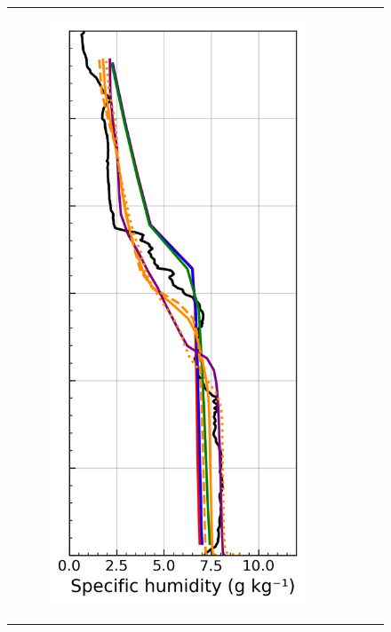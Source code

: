 \begin{figure}[hbtp]
{\begin{tabular}{@{}cccc@{}}
\begin{subfigure}[t]{0.29\textwidth}
            \includegraphics[width=\textwidth]{images/chap6/profiles/profile_elsplans_ovap_1507_sensbins.png}

\end{subfigure}
\end{tabular}}
\end{figure}
